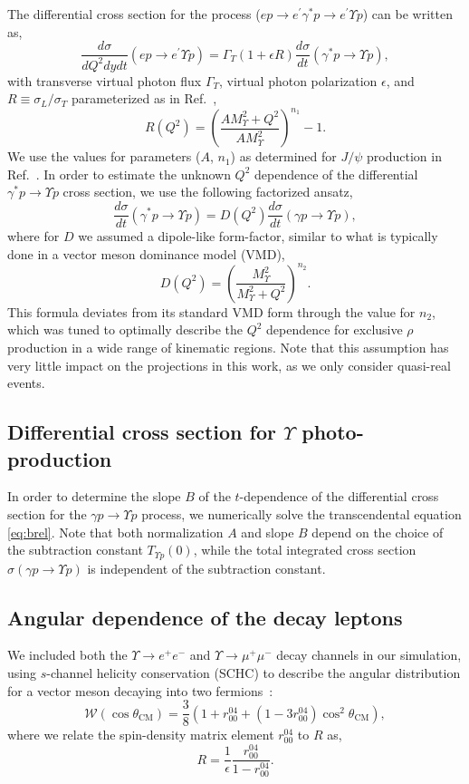 \documentclass[prd,amsmath,%
twocolumn,floatfix,amssymb, preprintnumbers, linenumbers,nofootinbib, superscriptaddress]{revtex4}
\newcommand{\beq}{\begin{equation}}
\newcommand{\eeq}{\end{equation}}
\begin{document}
The differential cross section for the process ($e p \to e^\prime \gamma^* p \to e^\prime \Upsilon p$) can be written as,
\beq
\frac{d\sigma}{dQ^2dydt}(e p \to e^\prime \Upsilon p) = 
\Gamma_T(1+\epsilon R)
\frac{d\sigma}{dt}(\gamma^* p \to \Upsilon p),
\eeq
with transverse virtual photon flux $\Gamma_T$, virtual photon polarization $\epsilon$, and 
$R\equiv\sigma_L/\sigma_T$ parameterized as in Ref.~\cite{Martynov:2002ez},
\beq
R(Q^2) = \left(\frac{A M_\Upsilon^2 + Q^2}{A M_\Upsilon^2}\right)^{n_1} - 1.
\eeq
We use the values for parameters ($A$, $n_1$) as determined for $J/\psi$ production in Ref.~\cite{Fiore:2009xk}.
In order to estimate the unknown $Q^2$ dependence of the differential $\gamma^* p \to \Upsilon p$ cross section, we use the following factorized ansatz,
\beq
\frac{d\sigma}{dt}(\gamma^* p \to \Upsilon p) = D(Q^2) \frac{d\sigma}{dt}(\gamma p \to \Upsilon p),
\eeq
where for $D$ we assumed a dipole-like form-factor, similar to what is typically
done in a vector meson dominance model (VMD),
\beq
D(Q^2) = \left(\frac{M_\Upsilon^2}{M_\Upsilon^2 + Q^2}\right)^{n_2}.
\eeq
This formula deviates from its standard VMD form through the value for $n_2$, which was
tuned to optimally describe the $Q^2$ dependence for exclusive $\rho$ production in a wide range
of kinematic regions.
Note that this assumption has very little impact on the projections in this work, as we only consider quasi-real events.

\subsection{Differential cross section for $\Upsilon$ photo-production}

In order to determine the slope $B$ of the $t$-dependence of the differential cross section for 
the $\gamma p \to \Upsilon p$ process, we numerically solve the transcendental equation \eqref{eq:brel}.
Note that both  normalization $A$ and slope $B$ depend on the choice of the subtraction
constant $T_{\Upsilon p} (0)$, while the total integrated cross section 
$\sigma(\gamma p \to \Upsilon p)$ is independent of the subtraction constant.

\subsection{Angular dependence of the decay leptons}

We included both the $\Upsilon \to e^+e^-$ and $\Upsilon \to \mu^+\mu^-$ decay channels
in our simulation, using $s$-channel helicity conservation (SCHC) to describe the
angular distribution for a vector meson decaying into two fermions~\cite{Breitweg:1998nh,Chekanov:2002xi,Schilling:1973ag}:
\beq
\mathcal{W}(\cos\theta_\text{CM}) = 
\frac{3}{8}(1+r^{04}_{00}+(1-3r_{00}^{04})\cos^2\theta_\text{CM}),
\eeq
where we relate the spin-density matrix element $r^{04}_{00}$ to $R$ as,
\beq
R = \frac{1}{\epsilon}\frac{r^{04}_{00}}{1-r^{04}_{00}}.
\eeq
\end{document}
